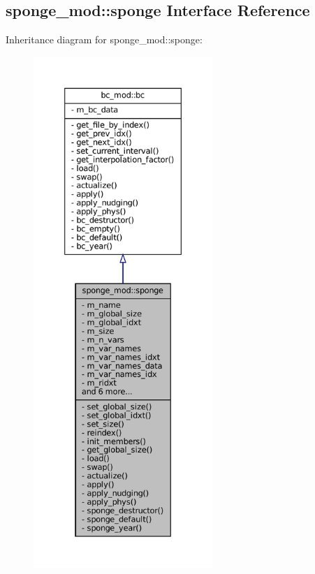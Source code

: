 \hypertarget{structsponge__mod_1_1sponge}{}\subsection{sponge\+\_\+mod\+:\+:sponge Interface Reference}
\label{structsponge__mod_1_1sponge}


Inheritance diagram for sponge\+\_\+mod\+:\+:sponge\+:
\nopagebreak
\begin{figure}[H]
\begin{center}
\leavevmode
\includegraphics[height=550pt]{structsponge__mod_1_1sponge__inherit__graph}
\end{center}
\end{figure}
